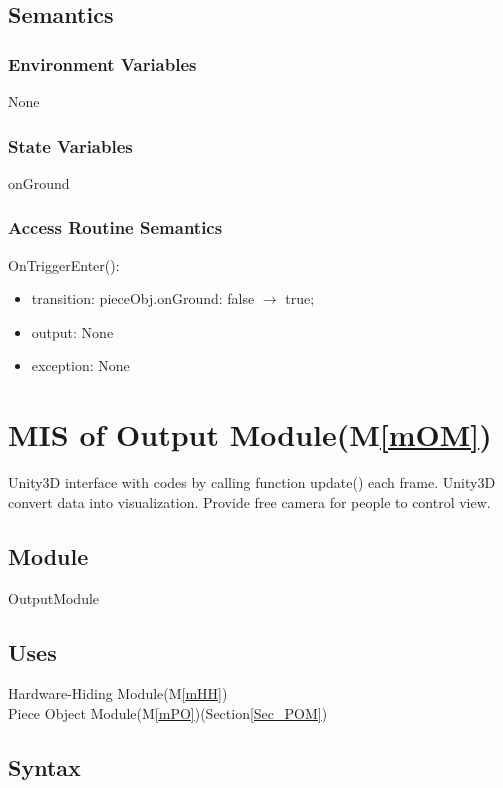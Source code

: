\documentclass[12pt, titlepage]{article}
\newcommand{\mref}[1]{M\ref{#1}}
\begin{document}
\subsection{Semantics}

\subsubsection{Environment Variables}
None
\subsubsection{State Variables}

onGround

\subsubsection{Access Routine Semantics}

\noindent OnTriggerEnter():
\begin{itemize}
	\item transition: pieceObj.onGround: false $\to$ true;
	\item output: None 
	\item exception: None 
\end{itemize}

\section{MIS of Output Module(\mref{mOM})}
\label{Sec_MOM}
Unity3D interface with codes by calling function update() each frame. Unity3D convert data into visualization. Provide free camera for people to control view.

\subsection{Module}

OutputModule

\subsection{Uses}

Hardware-Hiding Module(\mref{mHH})\\
Piece Object Module(\mref{mPO})(Section\ref{Sec_POM})

\subsection{Syntax}
\end{document}
